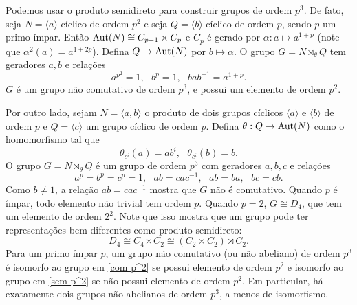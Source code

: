 	\par\vspace{0.3cm} Podemos usar o produto semidireto para construir grupos de ordem $p^3$. 
	De fato, seja $N = \langle a \rangle$ cíclico de ordem $p^2$ e seja $Q = \langle b \rangle$
	cíclico de ordem $p$, sendo $p$ um primo ímpar. Então $\operatorname{Aut}(N)\cong C_{p-1}\times C_p$ e $C_p$ 
	é gerado por $\alpha:a\mapsto a^{1+p}$ (note que $\alpha^2(a) = a^{1+2p}$). 
	Defina $Q\to \operatorname{Aut}(N)$ por $b\mapsto\alpha$. O grupo $G = N\rtimes_{\theta} Q$ 
	tem geradores $a,b$ e relações
	\begin{equation}
	\label{com p^2}
	    a^{p^2} = 1, \text{ }b^p=1, \text{ }bab^{-1} = a^{1+p}.
	\end{equation}
	$G$ é um grupo não comutativo de ordem $p^3$, e possui um elemento de ordem $p^2$.
	
	\par\vspace{0.3cm} Por outro lado, sejam $N = \langle a,b\rangle$ o produto de dois grupos cíclicos 
	$\langle a \rangle$ e $\langle b \rangle$ de ordem $p$ e $Q = \langle c \rangle$ um grupo cíclico 
	de ordem $p$. Defina $\theta: Q\to\operatorname{Aut}(N)$ como o homomorfismo tal que
	\begin{equation*}
	    \theta_{c^i}(a) = ab^i, \text{ }\theta_{c^i}(b) = b.
	\end{equation*}
	O grupo $G = N\rtimes_{\theta} Q$ é um grupo de ordem $p^3$ com geradores $a,b,c$ 
	e relações
	\begin{equation}
	\label{sem p^2}
	    a^p=b^p=c^p=1, \text{ }ab = cac^{-1}, \text{ }ab = ba, \text{ }bc = cb.
	\end{equation}
	Como $b\neq 1$, a relação $ab = cac^{-1}$ mostra que $G$ não é comutativo. 
	Quando $p$ é ímpar, todo elemento não trivial tem ordem $p$. Quando $p=2$, $G\cong D_4$, que 
	tem um elemento de ordem $2^2$. Note que isso mostra que um grupo pode ter representações bem 
	diferentes como produto semidireto:
	\begin{equation*}
	    D_4\cong C_4\rtimes C_2\cong (C_2\times C_2)\rtimes C_2.
	\end{equation*}
	Para um primo ímpar $p$, um grupo não comutativo (ou não abeliano) de ordem $p^3$ 
	é isomorfo ao grupo em \eqref{com p^2} se possui elemento de ordem $p^2$ e isomorfo ao grupo em 
	\eqref{sem p^2} se não possui elemento de ordem $p^2$. Em particular, há exatamente dois grupos 
	não abelianos de ordem $p^3$, a menos de isomorfismo.